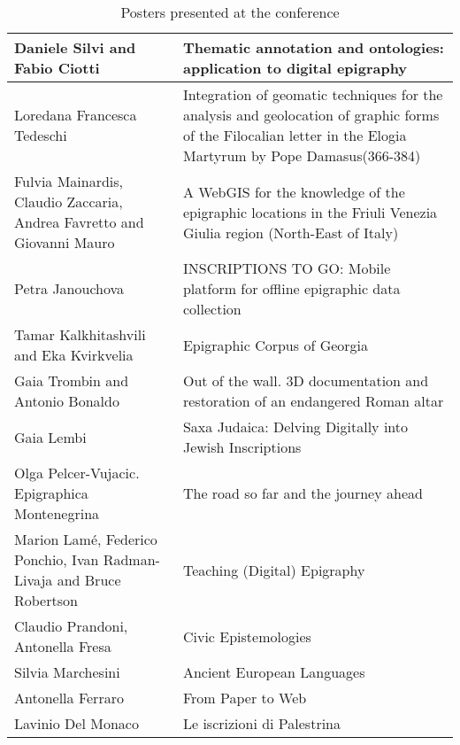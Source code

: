 \begin{table}
{\begin{tabular*}{\textwidth}{p{4.5cm}|p{6cm}}
Daniele Silvi and Fabio Ciotti & Thematic annotation and ontologies: application to digital epigraphy\\\hline
Loredana Francesca Tedeschi & Integration of geomatic techniques for the analysis and geolocation of graphic forms of the Filocalian letter in the Elogia Martyrum by Pope Damasus(366-384)\\\hline
Fulvia Mainardis, Claudio Zaccaria, Andrea Favretto and Giovanni Mauro & A WebGIS for the knowledge of the epigraphic locations in the Friuli Venezia Giulia region (North-East of Italy)\\\hline
Petra Janouchova & INSCRIPTIONS TO GO: Mobile platform for offline epigraphic data collection\\\hline
Tamar Kalkhitashvili and Eka Kvirkvelia & Epigraphic Corpus of Georgia\\\hline
Gaia Trombin and Antonio Bonaldo & Out of the wall. 3D documentation and restoration of an endangered Roman altar\\\hline
Gaia Lembi & Saxa Judaica: Delving Digitally into Jewish Inscriptions\\\hline
Olga Pelcer-Vujacic. Epigraphica Montenegrina & The road so far and the journey ahead\\\hline
Marion Lamé, Federico Ponchio, Ivan Radman-Livaja and Bruce Robertson & Teaching (Digital) Epigraphy\\\hline
Claudio Prandoni, Antonella Fresa & Civic Epistemologies \\\hline
Silvia Marchesini & Ancient European Languages \\
Antonella Ferraro & From Paper to Web \\
Lavinio Del Monaco & Le iscrizioni di Palestrina \\
\bottomrule

\end{tabular*}}

\caption{Posters presented at the conference}
\label{tab:table2}
\end{table}